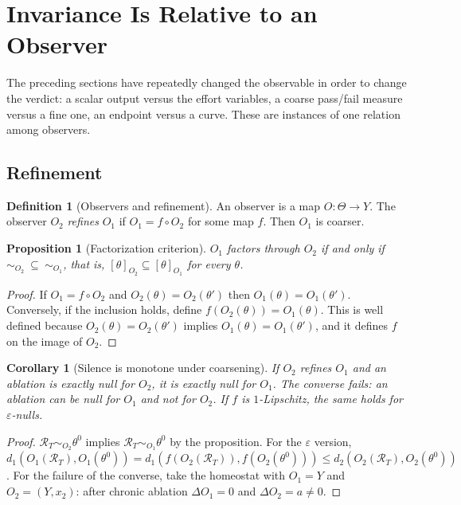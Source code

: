 \documentclass[11pt]{article}
\newtheorem{proposition}[theorem]{Proposition}
\newtheorem{corollary}[theorem]{Corollary}
\theoremstyle{definition}
\newtheorem{definition}[theorem]{Definition}
\theoremstyle{remark}
\newcommand{\Rop}{\mathcal{R}}
\begin{document}
\section{Invariance Is Relative to an Observer}\label{sec:observer}

The preceding sections have repeatedly changed the observable in order to change the verdict: a scalar output versus the effort variables, a coarse pass/fail measure versus a fine one, an endpoint versus a curve. These are instances of one relation among observers.

\subsection{Refinement}

\begin{definition}[Observers and refinement]
An observer is a map $O:\Theta\to Y$. The observer $O_2$ \emph{refines} $O_1$ if $O_1=f\circ O_2$ for some map $f$. Then $O_1$ is coarser.
\end{definition}

\begin{proposition}[Factorization criterion]\label{prop:factor}
$O_1$ factors through $O_2$ if and only if $\sim_{O_2}\ \subseteq\ \sim_{O_1}$, that is, $[\theta]_{O_2}\subseteq[\theta]_{O_1}$ for every $\theta$.
\end{proposition}
\begin{proof}
If $O_1=f\circ O_2$ and $O_2(\theta)=O_2(\theta')$ then $O_1(\theta)=O_1(\theta')$. Conversely, if the inclusion holds, define $f(O_2(\theta))=O_1(\theta)$. This is well defined because $O_2(\theta)=O_2(\theta')$ implies $O_1(\theta)=O_1(\theta')$, and it defines $f$ on the image of $O_2$.
\end{proof}

\begin{corollary}[Silence is monotone under coarsening]\label{cor:mono}
If $O_2$ refines $O_1$ and an ablation is exactly null for $O_2$, it is exactly null for $O_1$. The converse fails: an ablation can be null for $O_1$ and not for $O_2$. If $f$ is $1$-Lipschitz, the same holds for $\varepsilon$-nulls.
\end{corollary}
\begin{proof}
$\Rop_T\sim_{O_2}\theta^0$ implies $\Rop_T\sim_{O_1}\theta^0$ by the proposition. For the $\varepsilon$ version, $d_1(O_1(\Rop_T),O_1(\theta^0))=d_1(f(O_2(\Rop_T)),f(O_2(\theta^0)))\le d_2(O_2(\Rop_T),O_2(\theta^0))$. For the failure of the converse, take the homeostat with $O_1=Y$ and $O_2=(Y,x_2)$: after chronic ablation $\Delta O_1=0$ and $\Delta O_2=a\ne0$.
\end{proof}
\end{document}
